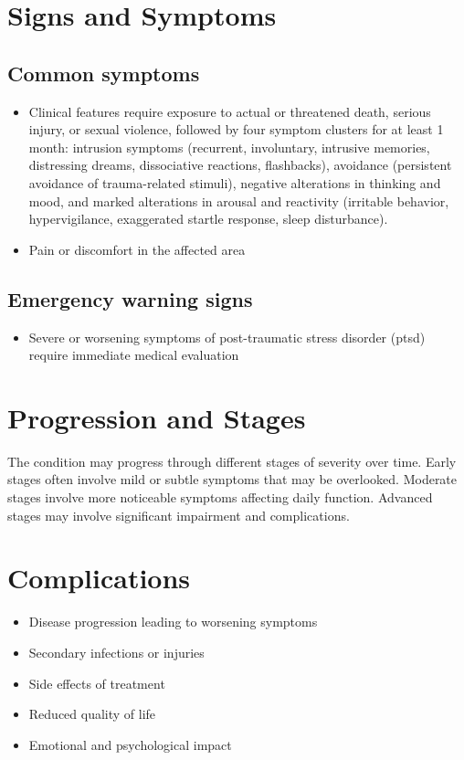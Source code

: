 \section{Signs and Symptoms}
\subsection{Common symptoms}
\begin{itemize}[noitemsep]
  \item Clinical features require exposure to actual or threatened death, serious injury, or sexual violence, followed by four symptom clusters for at least 1 month: intrusion symptoms (recurrent, involuntary, intrusive memories, distressing dreams, dissociative reactions, flashbacks), avoidance (persistent avoidance of trauma-related stimuli), negative alterations in thinking and mood, and marked alterations in arousal and reactivity (irritable behavior, hypervigilance, exaggerated startle response, sleep disturbance).
  \item Pain or discomfort in the affected area
  \end{itemize}
\subsection{Emergency warning signs}
\begin{itemize}[noitemsep]
  \item Severe or worsening symptoms of post-traumatic stress disorder (ptsd) require immediate medical evaluation
\end{itemize}
\section{Progression and Stages}
The condition may progress through different stages of severity over time. Early stages often involve mild or subtle symptoms that may be overlooked. Moderate stages involve more noticeable symptoms affecting daily function. Advanced stages may involve significant impairment and complications.
\section{Complications}
\begin{itemize}[noitemsep]
  \item Disease progression leading to worsening symptoms
  \item Secondary infections or injuries
  \item Side effects of treatment
  \item Reduced quality of life
  \item Emotional and psychological impact
\end{itemize}
